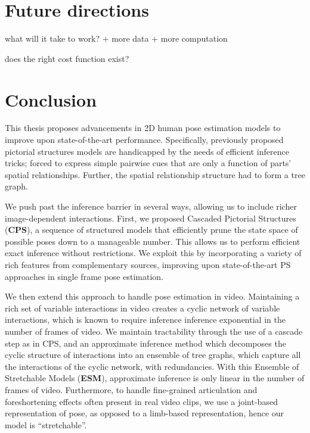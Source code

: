 \chapter{Future directions}

what will it take to work?
  + more data
  + more computation

does the right cost function exist?

\chapter{Conclusion}

This thesis proposes advancements in 2D human pose estimation models to improve 
upon state-of-the-art performance.  Specifically, previously proposed pictorial 
structures models are handicapped by the needs of efficient inference tricks; 
forced to express simple pairwise cues that are only a function of parts' 
spatial relationships.  Further, the spatial relationship structure had to form 
a tree graph.

We push past the inference barrier in several ways, allowing us to include 
richer image-dependent interactions.  First, we proposed Cascaded Pictorial 
Structures ({\bf CPS}), a sequence of structured models that efficiently prune 
the state space of possible poses down to a manageable number.  This allows us 
to perform efficient exact inference without restrictions.  We exploit this by 
incorporating a variety of rich features from complementary sources, improving 
upon state-of-the-art PS approaches in single frame pose estimation.

We then extend this approach to handle pose estimation in video.  Maintaining a 
rich set of variable interactions in video creates a cyclic network of variable 
interactions, which is known to require inference inference exponential in the 
number of frames of video.  We maintain tractability through the use of a 
cascade step as in CPS, and an approximate inference method which decomposes 
the cyclic structure of interactions into an ensemble of tree graphs, which 
capture all the interactions of the cyclic network, with redundancies.  With 
this Ensemble of Stretchable Models ({\bf ESM}), approximate inference is only 
linear in the number of frames of video.  Furthermore, to handle fine-grained 
articulation and foreshortening effects often present in real video clips, we 
use a joint-based representation of pose, as opposed to a limb-based 
representation, hence our model is ``stretchable''.

